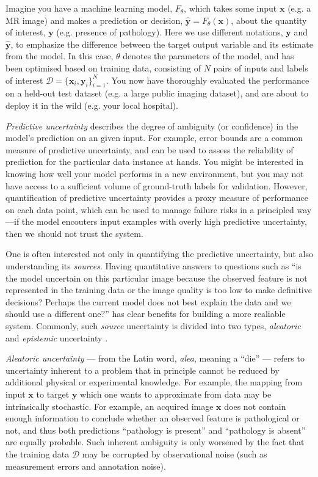 Imagine you have a machine learning model, $F_{\theta}$, which takes some input $\mathbf{x}$  (e.g. a MR image) and makes a prediction or decision, $\hat{\mathbf{y}}=F_{\theta}(\mathbf{x})$, about the quantity of interest, $\mathbf{y}$ (e.g. presence of pathology). Here we use different notations, $\mathbf{y}$ and $\hat{\mathbf{y}}$, to emphasize the difference between the target output variable and its estimate from the model. In this case, $\theta$ denotes the parameters of the model, and has been optimised based on training data, consisting of $N$ pairs of inputs and labels of interest $\mathcal{D} = \{\mathbf{x}_{i}, \mathbf{y}_i\}_{i=1}^N $. You now have thoroughly evaluated the performance on a held-out test dataset (e.g. a large public imaging dataset), and are about to deploy it in the wild (e.g. your local hospital).

\textit{Predictive uncertainty} describes the degree of ambiguity (or confidence) in the model's prediction on an given input. For example, error bounds are a common measure of predictive uncertainty, and can be used to assess the reliability of prediction for the particular data instance at hands. You might be interested in knowing how well your model performs in a new environment, but you may not have access to a sufficient volume of ground-truth labels for validation. However, quantification of predictive uncertainty provides a proxy measure of performance on each data point, which can be used to manage failure risks in a principled way---if the model encouters input examples with overly high predictive uncertainty, then we should not trust the system. 

One is often interested not only in quantifying the predictive uncertainty, but also understanding its \textit{sources}. Having quantitative answers to questions such as ``is the model uncertain on this particular image because the observed feature is not represented in the training data or the image quality is too low to make definitive decisions? Perhaps the current model does not best explain the data and we should use a different one?'' has clear benefits for building a more realiable system. Commonly, such \textit{source} uncertainty is divided into two types, \textit{aleatoric} and \textit{epistemic} uncertainty \cite{hora1996aleatory,der2009aleatory}. 

\textit{Aleatoric uncertainty} --- from the Latin word, \textit{alea}, meaning a ``die'' --- refers to uncertainty inherent to a problem that in principle cannot be reduced by additional physical or experimental knowledge. For example, the mapping from input $\textbf{x}$ to target $\mathbf{y}$ which one wants to approximate from data may be intrinsically stochastic. For example, an acquired image $\textbf{x}$ does not contain enough information to conclude whether an observed feature is pathological or not, and thus both predictions ``pathology is present'' and ``pathology is absent'' are equally probable. Such inherent ambiguity is only worsened by the fact that the training data $\mathcal{D}$ may be corrupted by observational noise (such as measurement errors and annotation noise).  

